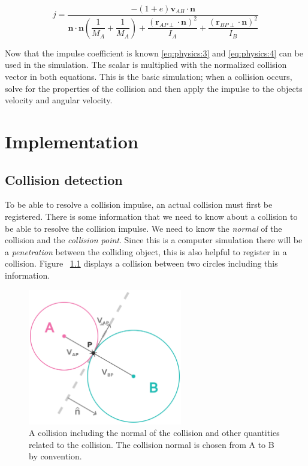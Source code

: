 \documentclass[a4paper,12pt]{report}
\begin{document}
\begin{equation}
j = \dfrac{ -(1+e) \mathbf v_{AB} \cdot \mathbf n }{
    \mathbf n \cdot \mathbf n ( \dfrac{1}{M_{A}} + \dfrac{1}{M_{A}} )
    + \dfrac{ (\mathbf r_{AP\perp} \cdot \mathbf n)^2}{I_{A} }
    + \dfrac{ (\mathbf r_{BP\perp} \cdot \mathbf n)^2}{I_{B} } }
\label{eq:physics:7}
\end{equation}

Now that the impulse coefficient is known \ref{eq:physics:3} and \ref{eq:physics:4} can be used in the simulation. The scalar is multiplied with the normalized collision vector in both equations. This is the basic simulation; when a collision occurs, solve for the properties of the collision and then apply the impulse to the objects velocity and angular velocity.


\chapter{Implementation}

\section{Collision detection}

To be able to resolve a collision impulse, an actual collision must first be registered. There is some information that we need to know about a collision to be able to resolve the collision impulse. We need to know the \emph{normal} of the collision and the \emph{collision point}. Since this is a computer simulation there will be a \emph{penetration} between the colliding object, this is also helpful to register in a collision. Figure ~\ref{fig:collision} displays a collision between two circles including this information.

\begin{figure}[!ht]
    \centering
    \includegraphics[width=0.6\textwidth]{figures/collision.png}
    \caption{A collision including the normal of the collision and other quantities related to the collision. The collision normal is chosen from A to B by convention.}
    \label{fig:collision}
\end{figure}
\end{document}
